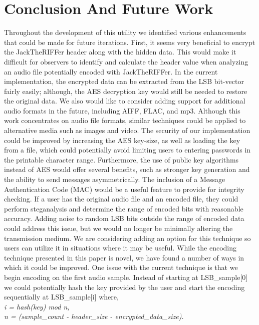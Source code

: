 \section{Conclusion And Future Work}
Throughout the development of this utility we identified various enhancements that could be made for future iterations. First, it seems very beneficial to encrypt the JackTheRIFFer header along with the hidden data. This would make it difficult for observers to identify and calculate the header value when analyzing an audio file potentially encoded with JackTheRIFFer. In the current implementation, the encrypted data can be extracted from the LSB bit-vector fairly easily; although, the AES decryption key would still be needed to restore the original data. We also would like to consider adding support for additional audio formats in the future, including AIFF, FLAC, and mp3. Although this work concentrates on audio file formats, similar techniques could be applied to alternative media such as images and video. The security of our implementation could be improved by increasing the AES key-size, as well as loading the key from a file, which could potentially avoid limiting users to entering passwords in the printable character range. Furthermore, the use of public key algorithms instead of AES would offer several benefits, such as stronger key generation and the ability to send messages asymmetrically. The inclusion of a Message Authentication Code (MAC) would be a useful feature to provide for integrity checking. If a user has the original audio file and an encoded file, they could perform steganalysis and determine the range of encoded bits with reasonable accuracy. Adding noise to random LSB bits outside the range of encoded data could address this issue, but we would no longer be minimally altering the transmission medium. We are considering adding an option for this technique so users can utilize it in situations where it may be useful. While the encoding technique presented in this paper is novel, we have found a number of ways in which it could be improved. One issue with the current technique is that we begin encoding on the first audio sample. Instead of starting at LSB\_sample[0] we could potentially hash the key provided by the user and start the encoding sequentially at LSB\_sample[i] where,\\
\textit{i = hash(key) mod n, \\
n = (sample\_count - header\_size - encrypted\_data\_size).}


